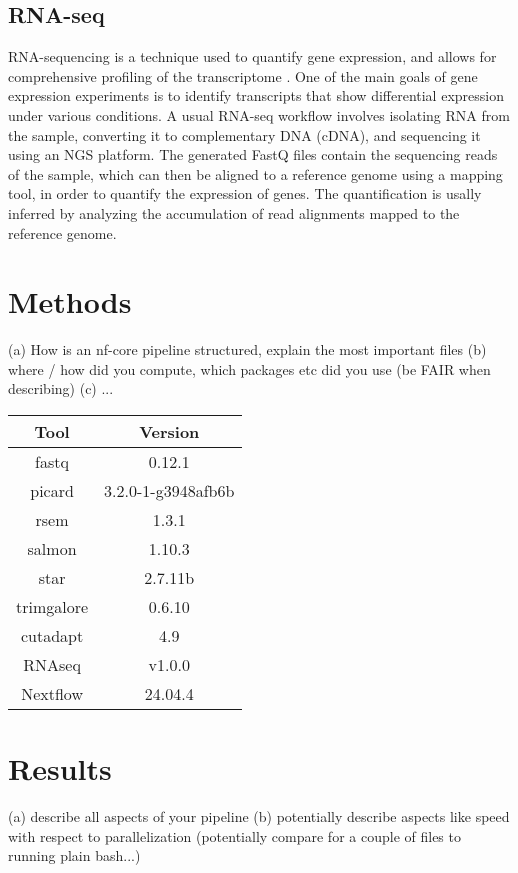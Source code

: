 \documentclass{article}
\theoremstyle{plain}
\theoremstyle{definition}
\theoremstyle{remark}
\begin{document}
\subsection{RNA-seq}
RNA-sequencing is a technique used to quantify gene expression, and allows for comprehensive profiling of the transcriptome \cite{Kukurba2015}. One of the main goals of gene expression experiments is to identify transcripts that show differential expression under various conditions. A usual RNA-seq workflow involves isolating RNA from the sample, converting it to complementary DNA (cDNA), and sequencing it using an NGS platform. The generated FastQ files contain the sequencing reads of the sample, which can then be aligned to a reference genome using a mapping tool, in order to quantify the expression of genes. The quantification is usally inferred by analyzing the accumulation of read alignments mapped to the reference genome.

\section{Methods}
(a) How is an nf-core pipeline structured, explain the most important files
(b) where / how did you compute, which packages etc did you use (be FAIR when describing)
(c) ...

\begin{table}[h!]
    \centering
    \begin{tabular}{||c c||}
        \hline
        Tool & Version \\
        \hline\hline
        fastq & 0.12.1\\
        picard & 3.2.0-1-g3948afb6b\\
        rsem & 1.3.1\\
        salmon & 1.10.3\\
        star & 2.7.11b\\
        trimgalore & 0.6.10\\
        cutadapt & 4.9\\
        RNAseq & v1.0.0\\
        Nextflow & 24.04.4\\
    \end{tabular}
\end{table}

\section{Results}
(a) describe all aspects of your pipeline
(b) potentially describe aspects like speed with respect to parallelization (potentially compare
for a couple of files to running plain bash...)
\end{document}
